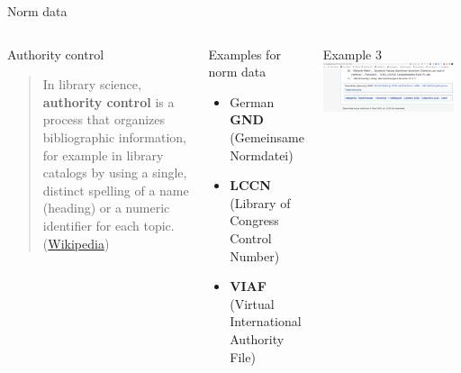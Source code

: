 \begin{frame}[allowframebreaks]{Norm data}
\begin{columns}[T,onlytextwidth]
  \end{columns}
  \framebreak
  
    \begin{columns}[T,onlytextwidth]
        \begin{alertblock}{Authority control}
        \begin{quote}
    In library science, \textbf{authority control} is a process that organizes bibliographic information, for example in library catalogs by using a single, distinct spelling of a name (heading) or a numeric identifier for each topic. (\href{https://en.wikipedia.org/wiki/Authority_control}{Wikipedia})
\end{quote}
      \end{alertblock}

      \begin{exampleblock}{Examples for norm data}\footnotesize
\begin{itemize}
    \item German \textbf{GND} (Gemeinsame Normdatei)
    \item \textbf{LCCN} (Library of Congress Control Number)
    \item \textbf{VIAF} (Virtual International Authority File)
\end{itemize}
      \end{exampleblock}
      
             
            \begin{block}{Example 3}
        \includegraphics[width=0.95\textwidth]{img/mmaier-wiki3.png}
      \end{block}

      \end{columns}
\end{frame}





